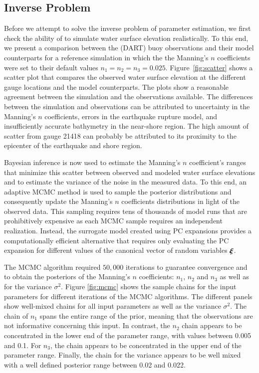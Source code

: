 \subsection{Inverse Problem} 
\label{sec:inverse}

Before we attempt to solve the inverse problem of parameter estimation, 
we first check the ability of \geoclaw to simulate water surface elevation
realistically. To this end, we present a comparison between the 
(DART) buoy observations and their \geoclaw model counterparts
for a reference simulation in which the the Manning's $n$ coefficients were set to their default values $n_1=n_2=n_3=0.025$. Figure~\ref{fig:scatter} 
shows a scatter plot that compares the observed 
water surface elevation at the different gauge locations and the \geoclaw model counterparts. The plots show a reasonable agreement between the simulation and the observations available.  The differences between the simulation and observations can be attributed to uncertainty in the Manning's $n$ coefficients, errors in the earthquake rupture model, and insufficiently accurate bathymetry in the near-shore region.  The high amount of scatter from gauge 21418 can probably be attributed to its proximity to the epicenter of the earthquake and shore region.

Bayesian inference is now used to estimate the Manning's 
$n$ coefficient's ranges that minimize this scatter between 
observed and modeled water surface elevations and to estimate the variance of the noise in the measured data.
To this end, an adaptive MCMC method is used to sample 
the posterior distributions \citep{Gareth2009,Haario2001} and consequently 
update the Manning's $n$ coefficients distributions in light of the 
observed data. This sampling requires tens of thousands of 
\geoclaw model runs that are prohibitively expensive as each MCMC 
sample requires an independent \geoclaw realization. Instead,
the surrogate model created using PC expansions provides a computationally
efficient alternative that requires only evaluating the PC expansion
for different values of the canonical vector of random variables $\xxi$.

The MCMC algorithm required $50,000$ iterations to guarantee convergence
and to obtain the posteriors of the Manning's $n$ coefficients: 
$n_1$, $n_2$ and $n_3$ as well as for the variance $\sigma^2$. Figure \ref{fig:mcmc} 
shows the sample chains for the input parameters for different iterations of the MCMC algorithms. 
The different panels show well-mixed chains for all input parameters as well as the variance $\sigma^2$.
The chain of  $n_{1}$ spans the entire range of the prior, meaning that the observations are not informative 
concerning this input.  In contrast, the $n_{2}$ chain appears to be concentrated in the 
lower end of the parameter range, with values between 0.005 and 0.1. 
For $n_{3}$, the chain appears to be concentrated in the 
upper end of the parameter range. Finally, the chain for the variance 
appears to be well mixed with a well defined posterior range between 0.02 and 0.022.  

